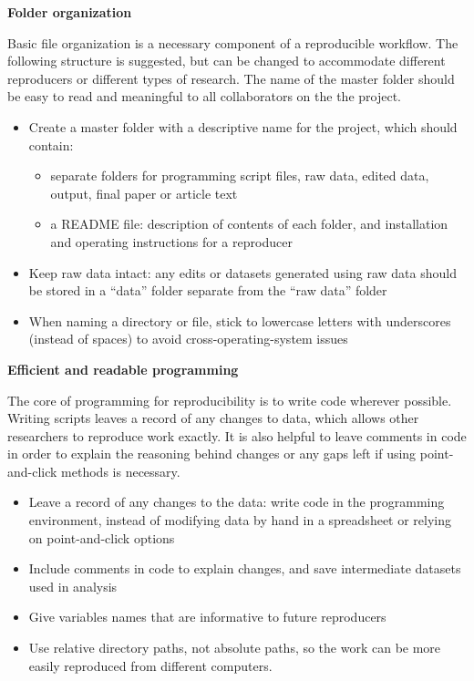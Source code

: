 \documentclass[]{book}
\providecommand{\tightlist}{%
  \setlength{\itemsep}{0pt}\setlength{\parskip}{0pt}}
\begin{document}
\textbf{Folder organization}

Basic file organization is a necessary component of a reproducible workflow. The following structure is suggested, but can be changed to accommodate different reproducers or different types of research. The name of the master folder should be easy to read and meaningful to all collaborators on the the project.

\begin{itemize}
\tightlist
\item
  Create a master folder with a descriptive name for the project, which should contain:

  \begin{itemize}
  \tightlist
  \item
    separate folders for programming script files, raw data, edited data, output, final paper or article text
  \item
    a README file: description of contents of each folder, and installation and operating instructions for a reproducer
  \end{itemize}
\item
  Keep raw data intact: any edits or datasets generated using raw data should be stored in a ``data'' folder separate from the ``raw data'' folder
\item
  When naming a directory or file, stick to lowercase letters with underscores (instead of spaces) to avoid cross-operating-system issues
\end{itemize}

\textbf{Efficient and readable programming}

The core of programming for reproducibility is to write code wherever possible. Writing scripts leaves a record of any changes to data, which allows other researchers to reproduce work exactly. It is also helpful to leave comments in code in order to explain the reasoning behind changes or any gaps left if using point-and-click methods is necessary.

\begin{itemize}
\tightlist
\item
  Leave a record of any changes to the data: write code in the programming environment, instead of modifying data by hand in a spreadsheet or relying on point-and-click options
\item
  Include comments in code to explain changes, and save intermediate datasets used in analysis
\item
  Give variables names that are informative to future reproducers
\item
  Use relative directory paths, not absolute paths, so the work can be more easily reproduced from different computers.
\end{itemize}
\end{document}
